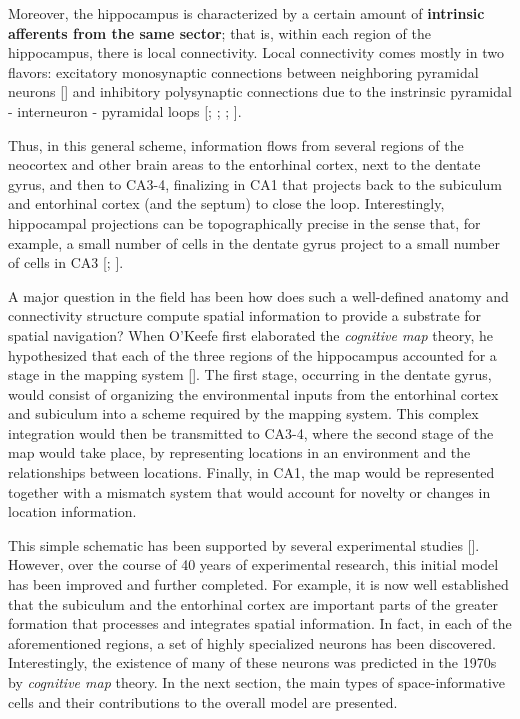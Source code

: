 Moreover, the hippocampus is characterized by a certain amount of \textbf{intrinsic afferents from the same sector}; that is, within each region of the hippocampus, there is local connectivity. Local connectivity comes mostly in two flavors: excitatory monosynaptic connections between neighboring pyramidal neurons [\cite{lebovitz1971}] and inhibitory polysynaptic connections due to the instrinsic pyramidal - interneuron - pyramidal loops [\cite{kandel1961}; \cite{spencerkandel1961c}; \cite{andersen1964a}; \cite{andersen1964b}].

Thus, in this general scheme, information flows from several regions of the neocortex and other brain areas to the entorhinal cortex, next to the dentate gyrus, and then to CA3-4, finalizing in CA1 that projects back to the subiculum and entorhinal cortex (and the septum) to close the loop. 
Interestingly, hippocampal projections can be topographically precise in the sense that, for example, a small number of cells in the dentate gyrus project to a small number of cells in CA3 [\cite{witter1993}; \cite{tamamaki1995}].

A major question in the field has been how does such a well-defined anatomy and connectivity structure compute spatial information to provide a substrate for spatial navigation? 
When O'Keefe first elaborated the \textit{cognitive map} theory, he hypothesized that each of the three regions of the hippocampus accounted for a stage in the mapping system [\cite{okeefebook}].
The first stage, occurring in the dentate gyrus, would consist of organizing the environmental inputs from the entorhinal cortex and subiculum into a scheme required by the mapping system. 
This complex integration would then be transmitted to CA3-4, where the second stage of the map would take place, by representing locations in an environment and the relationships between locations.
Finally, in CA1, the map would be represented together with a mismatch system that would account for novelty or changes in location information.

This simple schematic has been supported by several experimental studies [\cite{okeefe2014spatial}]. 
However, over the course of 40 years of experimental research, this initial model has been improved and further completed. 
For example, it is now well established that the subiculum and the entorhinal cortex are important parts of the greater formation that processes and integrates spatial information.
In fact, in each of the aforementioned regions, a set of highly specialized neurons has been discovered. 
Interestingly, the existence of many of these neurons was predicted in the 1970s by \textit{cognitive map} theory. 
In the next section, the main types of space-informative cells and their contributions to the overall model are presented. 

